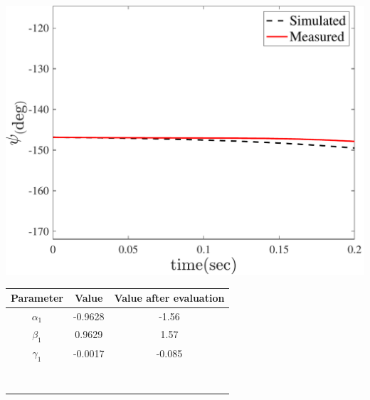 \documentclass[3p,times]{elsarticle}
\newcommand\Tstrut{\rule{0pt}{2.6ex}}         %
\begin{document}
\begin{minipage}[t]{0.95\linewidth}
\begin{minipage}[b]{0.48\linewidth}
	\end{minipage}
    \hfill
    \begin{minipage}[b]{0.48\linewidth}
		\centering
		\includegraphics[width=1\linewidth]{../Figure/parameter_estimation/3DOF/yaw}
		\captionsetup{justification=centering}
	\end{minipage}
    \begin{minipage}[b]{0.5\linewidth}
		\centering
		\begin{tabular}{ccc}\hline
			Parameter & Value & Value after evaluation
            \Tstrut\\ \hline
			$\alpha_1$  & -0.9628 & -1.56\Tstrut\\
            $\beta_1$  & 0.9629 & 1.57\Tstrut \\
            $\gamma_1$  & -0.0017 &-0.085\Tstrut\\ \hline
            \\\\\\\\\\\\\\\\
		\end{tabular}
	\captionsetup{justification=centering}
	\end{minipage}
\end{minipage}
\end{document}
